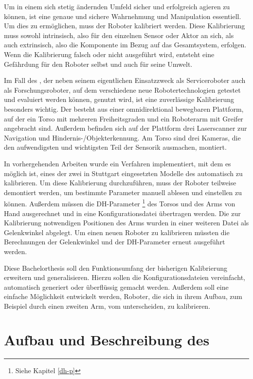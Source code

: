Um in einem sich stetig ändernden Umfeld sicher und erfolgreich agieren zu 
können, ist eine genaue und sichere Wahrnehmung und Manipulation essentiell. 
Um dies zu ermöglichen, muss der Roboter kalibriert werden. Diese Kalibrierung 
muss sowohl intrinsisch, also für den einzelnen Sensor oder Aktor an sich, als 
auch extrinsisch, also die Komponente im Bezug auf das Gesamtsystem, erfolgen. 
Wenn die Kalibrierung falsch oder nicht ausgeführt wird, entsteht
eine Gefährdung für den Roboter selbst und auch für seine Umwelt. 

Im Fall des \cob, der neben seinem eigentlichen Einsatzzweck als Serviceroboter auch
als Forschungsroboter, auf dem verschiedene neue Robotertechnologien getestet 
und evaluiert werden können, genutzt wird, ist eine zuverlässige Kalibrierung 
besonders wichtig. Der \cob besteht aus einer omnidirektional bewegbaren 
Plattform, auf der ein Torso mit mehreren Freiheitsgraden und ein Roboterarm 
mit Greifer angebracht sind. Außerdem befinden sich auf der Plattform drei 
Laserscanner zur Navigation und Hindernis-/Objekterkennung. Am Torso sind drei 
Kameras, die den aufwendigsten und wichtigsten Teil der Sensorik ausmachen, 
montiert.

In vorhergehenden Arbeiten wurde ein Verfahren implementiert, mit dem es möglich 
ist, eines der zwei in Stuttgart eingesetzten Modelle des \cob automatisch zu 
kalibrieren. Um diese Kalibrierung durchzuführen, muss der Roboter teilweise 
demontiert werden, um bestimmte Parameter manuell ablesen und einstellen zu 
können. Außerdem müssen die \ac{DH-Parameter} \footnote{Siehe Kapitel \ref{dh-p}} des Torsos und des Arms von Hand 
ausgerechnet und in eine Konfigurationsdatei übertragen werden. Die zur 
Kalibrierung notwendigen Positionen des Arms wurden in einer weiteren Datei als 
Gelenkwinkel abgelegt. Um einen neuen Roboter zu kalibrieren müssten die 
Berechnungen der Gelenkwinkel und der \ac{DH-Parameter} erneut ausgeführt werden. 

Diese Bachelorthesis soll den Funktionsumfang der bisherigen Kalibrierung 
erweitern und generalisieren. Hierzu sollen die Konfigurationsdateien vereinfacht, 
automatisch generiert oder überflüssig gemacht werden. Außerdem soll eine 
einfache Möglichkeit entwickelt werden, Roboter, die sich in ihrem Aufbau, zum Beispiel durch 
einen zweiten Arm, vom \cob unterscheiden, zu kalibrieren.



\section{Aufbau und Beschreibung des \cob}


